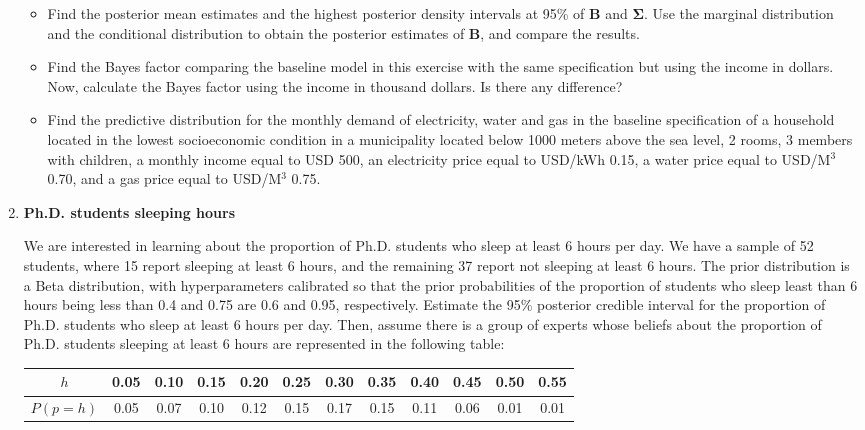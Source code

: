 \begin{enumerate}
\begin{itemize}
	\item Find the posterior mean estimates and the highest posterior density intervals at 95\% of $\bm{B}$ and $\bm{\Sigma}$. Use the marginal distribution and the conditional distribution to obtain the posterior estimates of  $\bm{B}$, and compare the results.
	\item Find the Bayes factor comparing the baseline model in this exercise with the same specification but using the income in dollars. Now, calculate the Bayes factor using the income in thousand dollars. Is there any difference?
	\item Find the predictive distribution for the monthly demand of electricity, water and gas in the baseline specification of a household located in the lowest socioeconomic condition in a municipality located below 1000 meters above the sea level, 2 rooms, 3 members with children, a monthly income equal to USD 500, an electricity price equal to USD/kWh 0.15, a water price equal to USD/M$^3$ 0.70, and a gas price equal to USD/M$^3$ 0.75. 
\end{itemize} 

\item \textbf{Ph.D. students sleeping hours \cite[Chap.~2]{albert2009bayesian}}

We are interested in learning about the proportion of Ph.D. students who sleep at least 6 hours per day. We have a sample of 52 students, where 15 report sleeping at least 6 hours, and the remaining 37 report not sleeping at least 6 hours. The prior distribution is a Beta distribution, with hyperparameters calibrated so that the prior probabilities of the proportion of students who sleep least than 6 hours being less than 0.4 and 0.75 are 0.6 and 0.95, respectively. Estimate the 95\% posterior credible interval for the proportion of Ph.D. students who sleep at least 6 hours per day. Then, assume there is a group of experts whose beliefs about the proportion of Ph.D. students sleeping at least 6 hours are represented in the following table:

\begin{table}[!htbp]%
	\label{tab:sleep}%
	\begin{tabular}{cccccccccccc}
		$h$   & 0.05 & 0.10 & 0.15 & 0.20 & 0.25 & 0.30 & 0.35 & 0.40 & 0.45 & 0.50 & 0.55  \\
		\hline
		$P(p=h)$ & 0.05 & 0.07 & 0.10 & 0.12 & 0.15 & 0.17 & 0.15 & 0.11 & 0.06 & 0.01 & 0.01 \\ 


\end{tabular}
\end{table}
\end{enumerate}
